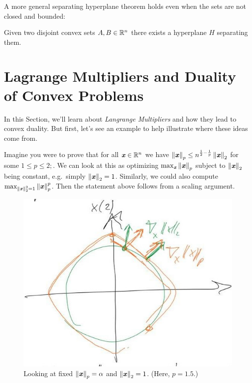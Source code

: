 A more general separating hyperplane theorem holds even when the sets
are not closed and bounded:

\begin{theorem} \label{th:sht}
Given two disjoint convex sets $A, B \in \mathbb{R}^n$ there exists a hyperplane $H$
separating them.
\end{theorem}


\section{Lagrange Multipliers and Duality of Convex Problems}

In this Section, we'll learn about \emph{Langrange Multipliers} and
how they lead to convex duality.
But first, let's see an example to help illustrate where these ideas
come from.

Imagine you were to prove that for all $\boldsymbol{\mathit{x}} \in \mathbb{R}^n$ we have $\left\| \boldsymbol{\mathit{x}} \right\|_p \leq n^{\frac{1}{2} - \frac{1}{p}}\left\| \boldsymbol{\mathit{x}} \right\|_2$ for some $1 \leq p \leq 2;$.
We can look at this as optimizing $\max_{\boldsymbol{\mathit{x}}} \left\| \boldsymbol{\mathit{x}} \right\|_p$ subject to
$\left\| \boldsymbol{\mathit{x}} \right\|_2$ being constant, e.g.\ simply $\left\| \boldsymbol{\mathit{x}} \right\|_2 = 1$.
Similarly, we could also compute $\max_{\left\| \boldsymbol{\mathit{x}} \right\|_2^2 = 1} \left\| \boldsymbol{\mathit{x}} \right\|_p^p$.
Then the statement above follows from a scaling argument.

\begin{figure}[ht]
  \centering
  \includegraphics[width=.48\textwidth]{fig/lec12-2p-norms.jpeg}
  \caption{Looking at fixed $\left\| \boldsymbol{\mathit{x}} \right\|_p = \alpha$ and $\left\| \boldsymbol{\mathit{x}} \right\|_2=1$. (Here, $p = 1.5$.)}
  \label{fig:2-p-norm}
\end{figure}

